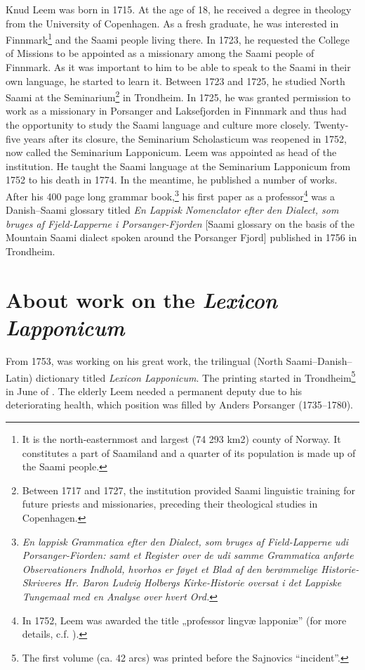 \documentclass[output=paper,colorlinks,citecolor=brown,arabicfont,chinesefont]{langscibook}
\begin{document}
Knud Leem was born in 1715. At the age of 18, he received a degree in theology from the University of Copenhagen. As a fresh graduate, he was interested in Finnmark\footnote{It is the north-easternmost and largest (74 293 km2) county of Norway. It constitutes a part of Saamiland and a quarter of its population is made up of the Saami people.} and the Saami people living there. In 1723,  he requested the College of Missions to be appointed as a missionary among the Saami people of Finnmark. As it was important to him to be able to speak to the Saami in their own language, he started to learn it. Between 1723 and 1725, he studied North Saami at the Seminarium\footnote{Between 1717 and 1727, the institution provided Saami linguistic training for future priests and missionaries, preceding their theological studies in Copenhagen.} in Trondheim. In 1725,  he was granted permission to work as a missionary in Porsanger and Laksefjorden in Finnmark and thus had the opportunity to study the Saami language and culture more closely. Twenty-five years after its closure, the Seminarium Scholasticum was reopened in 1752, now called the Seminarium Lapponicum. Leem was appointed as head of the institution. He taught the Saami language at the Seminarium Lapponicum from 1752 to his death in 1774. In the meantime, he published a number of works. After his 400 page long grammar book,\footnote{\emph{En lappisk Grammatica efter den Dialect, som bruges af Field-Lapperne udi Porsanger-Fiorden: samt et Register over de udi samme Grammatica anførte Observationers Indhold, hvorhos er føyet et Blad af den berømmelige Historie-Skriveres Hr. Baron Ludvig Holbergs Kirke-Historie oversat i det Lappiske Tungemaal med en Analyse over hvert Ord.}} his first paper as a professor\footnote{In 1752, Leem was awarded the title „professor lingvæ lapponiæ” (for more details, c.f. \citealt{Magga2003}).} was a Danish–Saami glossary titled \textit{En Lappisk Nomenclator efter den Dialect, som bruges af Fjeld-Lapperne i Porsanger-Fjorden} [Saami glossary on the basis of the Mountain Saami dialect spoken around the Porsanger Fjord] published in 1756 in Trondheim.

\section{About work on the \textit{Lexicon Lapponicum}}

From 1753, \citeauthor{Leem1768} was working on his great work, the trilingual (North Saami–Danish–Latin) dictionary titled \textit{Lexicon Lapponicum}. The printing started in Trondheim\footnote{The first volume (ca. 42 arcs) was printed before the Sajnovics “incident”.} in  June of \citeyear{Leem1768}. The elderly Leem needed a permanent deputy due to his deteriorating health, which position was filled by Anders Porsanger (1735--1780).
\end{document}
